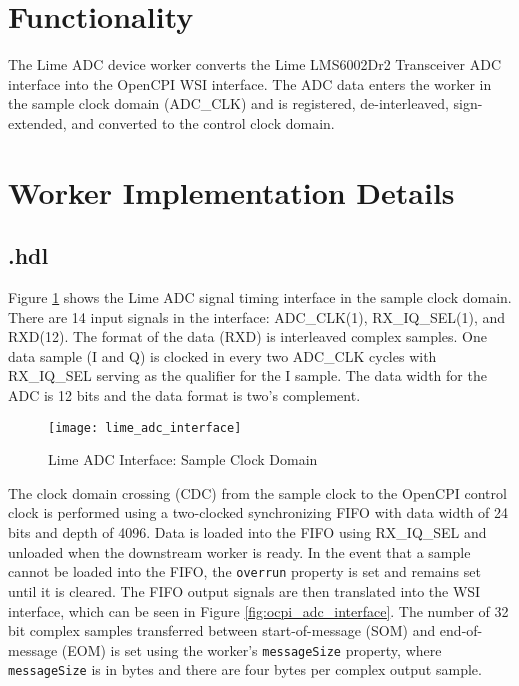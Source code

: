 \section*{Functionality}
\begin{flushleft}
	The Lime ADC device worker converts the Lime LMS6002Dr2 Transceiver ADC interface into the OpenCPI WSI interface. The ADC data enters the worker in the sample clock domain (ADC\_CLK) and is registered, de-interleaved, sign-extended, and converted to the control clock domain.
\end{flushleft}

\section*{Worker Implementation Details}
\subsection*{\comp.hdl}
Figure \ref{fig:lime_adc_interface} shows the Lime ADC signal timing interface in the sample clock domain. There are 14 input signals in the interface: ADC\_CLK(1), RX\_IQ\_SEL(1), and RXD(12). The format of the data (RXD) is interleaved complex samples. One data sample (I and Q) is clocked in every two ADC\_CLK cycles with RX\_IQ\_SEL serving as the qualifier for the I sample. The data width for the ADC is 12 bits and the data format is two's complement.\par\bigskip
\begin{figure}[ht]
	\centering
	\texttt{[image: lime\_adc\_interface]}
	\caption{Lime ADC Interface: Sample Clock Domain}
	\label{fig:lime_adc_interface}
\end{figure}
\noindent The clock domain crossing (CDC) from the sample clock to the OpenCPI control clock is performed using a two-clocked synchronizing FIFO with data width of 24 bits and depth of 4096. Data is loaded into the FIFO using RX\_IQ\_SEL and unloaded when the downstream worker is ready. In the event that a sample cannot be loaded into the FIFO, the \verb+overrun+ property is set and remains set until it is cleared. The FIFO output signals are then translated into the WSI interface, which can be seen in Figure \ref{fig:ocpi_adc_interface}. The number of 32 bit complex samples transferred between start-of-message (SOM) and end-of-message (EOM) is set using the worker's \verb+messageSize+ property, where \verb+messageSize+ is in bytes and there are four bytes per complex output sample.\par\bigskip
